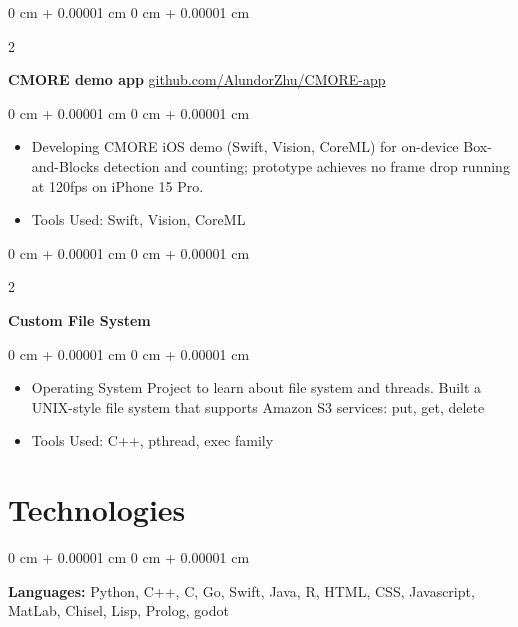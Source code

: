 \documentclass[10pt, letterpaper]{article}
\newenvironment{highlights}{
    \begin{itemize}[
        topsep=0.10 cm,
        parsep=0.10 cm,
        partopsep=0pt,
        itemsep=0pt,
        leftmargin=0 cm + 10pt
    ]
}{
    \end{itemize}
} %
\newenvironment{onecolentry}{
    \begin{adjustwidth}{
        0 cm + 0.00001 cm
    }{
        0 cm + 0.00001 cm
    }
}{
    \end{adjustwidth}
} %
\newenvironment{twocolentry}[2][]{
    \onecolentry
    \def\secondColumn{#2}
    \setcolumnwidth{\fill, 6 cm}
    \begin{paracol}{2}
}{
    \switchcolumn \raggedleft \secondColumn
    \end{paracol}
    \endonecolentry
} %
\begin{document}
        \vspace{0.2 cm}

        \begin{twocolentry}{
            \href{https://github.com/AlundorZhu/CMORE-app}{github.com/AlundorZhu/CMORE-app}
        }
            \textbf{CMORE demo app}\end{twocolentry}

        \vspace{0.10 cm}
        \begin{onecolentry}
            \begin{highlights}
                \item Developing CMORE iOS demo (Swift, Vision, CoreML) for on-device Box-and-Blocks detection and counting; prototype achieves no frame drop running at 120fps on iPhone 15 Pro.
                \item Tools Used: Swift, Vision, CoreML
            \end{highlights}
        \end{onecolentry}


        \vspace{0.2 cm}

        \begin{twocolentry}{
            2023
        }
            \textbf{Custom File System}\end{twocolentry}

        \vspace{0.10 cm}
        \begin{onecolentry}
            \begin{highlights}
                \item Operating System Project to learn about file system and threads. Built a UNIX-style file system that supports Amazon S3 services: put, get, delete
                \item Tools Used: C++, pthread, exec family
            \end{highlights}
        \end{onecolentry}



    
    \section{Technologies}



        
        \begin{onecolentry}
            \textbf{Languages:} Python, C++, C, Go, Swift, Java, R, HTML, CSS, Javascript, MatLab, Chisel, Lisp, Prolog, godot 
        \end{onecolentry}
\end{document}
